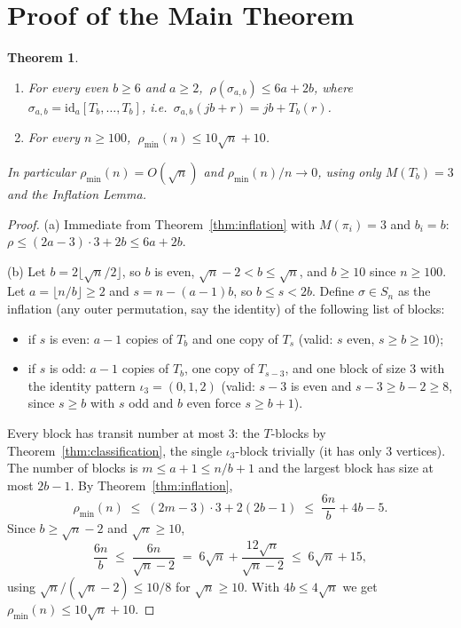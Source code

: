 \documentclass[11pt]{article}
\newtheorem{theorem}{Theorem}[section]
\theoremstyle{definition}
\newcommand{\pmin}{\rho_{\min}}
\begin{document}
\section{Proof of the Main Theorem}\label{sec:main}

\begin{theorem}\label{thm:main}
\begin{enumerate}
\item[(a)] For every even $b \ge 6$ and $a \ge 2$,
$\ \rho(\sigma_{a,b}) \le 6a + 2b$, where
$\sigma_{a,b} = \mathrm{id}_a[T_b, \dots, T_b]$, i.e.\
$\sigma_{a,b}(jb+r) = jb + T_b(r)$.
\item[(b)] For every $n \ge 100$, $\ \pmin(n) \le 10\sqrt n + 10$.
\end{enumerate}
In particular $\pmin(n) = O(\sqrt n)$ and $\pmin(n)/n \to 0$, using only
$M(T_b) = 3$ and the Inflation Lemma.
\end{theorem}

\begin{proof}
(a) Immediate from Theorem~\ref{thm:inflation} with $M(\pi_i) = 3$ and $b_i = b$:
$\rho \le (2a-3)\cdot 3 + 2b \le 6a + 2b$.

(b) Let $b = 2\lfloor \sqrt n / 2 \rfloor$, so $b$ is even, $\sqrt n - 2 < b \le
\sqrt n$, and $b \ge 10$ since $n \ge 100$. Let $a = \lfloor n/b \rfloor \ge 2$ and
$s = n - (a-1)b$, so $b \le s < 2b$. Define $\sigma \in S_n$ as the inflation (any
outer permutation, say the identity) of the following list of blocks:
\begin{itemize}
\item if $s$ is even: $a - 1$ copies of $T_b$ and one copy of $T_s$
(valid: $s$ even, $s \ge b \ge 10$);
\item if $s$ is odd: $a - 1$ copies of $T_b$, one copy of $T_{s-3}$, and one block
of size $3$ with the identity pattern $\iota_3 = (0,1,2)$ (valid: $s - 3$ is even
and $s - 3 \ge b - 2 \ge 8$, since $s \ge b$ with $s$ odd and $b$ even force
$s \ge b + 1$).
\end{itemize}
Every block has transit number at most $3$: the $T$-blocks by
Theorem~\ref{thm:classification}, the single $\iota_3$-block trivially (it has only
$3$ vertices). The number of blocks is $m \le a + 1 \le n/b + 1$ and the largest
block has size at most $2b - 1$. By Theorem~\ref{thm:inflation},
\[
\pmin(n) \;\le\; (2m - 3)\cdot 3 + 2(2b - 1)
\;\le\; \frac{6n}{b} + 4b - 5 .
\]
Since $b \ge \sqrt n - 2$ and $\sqrt n \ge 10$,
\[
\frac{6n}{b} \;\le\; \frac{6n}{\sqrt n - 2}
\;=\; 6\sqrt n + \frac{12\sqrt n}{\sqrt n - 2}
\;\le\; 6\sqrt n + 15,
\]
using $\sqrt n/(\sqrt n - 2) \le 10/8$ for $\sqrt n \ge 10$. With $4b \le 4\sqrt n$
we get $\pmin(n) \le 10\sqrt n + 10$.
\end{proof}
\end{document}

